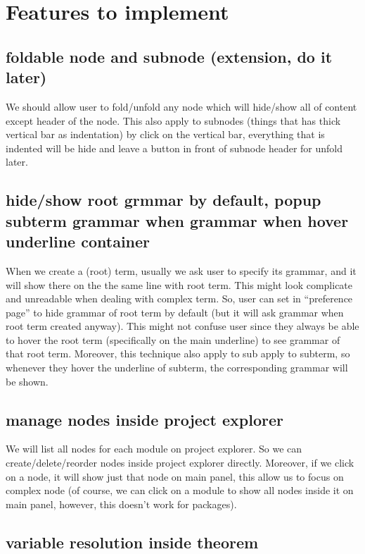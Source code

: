 \documentclass[master.tex]{subfiles}
\begin{document}
\section{Features to implement}

\subsection{foldable node and subnode (extension, do it later)}

We should allow user to fold/unfold any node which will hide/show all of content except header of the node. This also apply to subnodes (things that has thick vertical bar as indentation) by click on the vertical bar, everything that is indented will be hide and leave a button in front of subnode header for unfold later.

\subsection{hide/show root grmmar by default, popup subterm grammar when  grammar when hover underline container}

When we create a (root) term, usually we ask user to specify its grammar, and it will show there on the the same line with root term. This might look complicate and unreadable when dealing with complex term. So, user can set in ``preference page'' to hide grammar of root term by default (but it will ask grammar when root term created anyway). This might not confuse user since they always be able to hover the root term (specifically on the main underline) to see grammar of that root term. Moreover, this technique also apply to sub  apply to subterm, so whenever they hover the underline of subterm, the corresponding grammar will be shown.

\subsection{manage nodes inside project explorer}

We will list all nodes for each module on project explorer. So we can create/delete/reorder nodes inside project explorer directly. Moreover, if we click on a node, it will show just that node on main panel, this allow us to focus on complex node (of course, we can click on a module to show all nodes inside it on main panel, however, this doesn't work for packages).

\subsection{variable resolution inside theorem}
\end{document}
